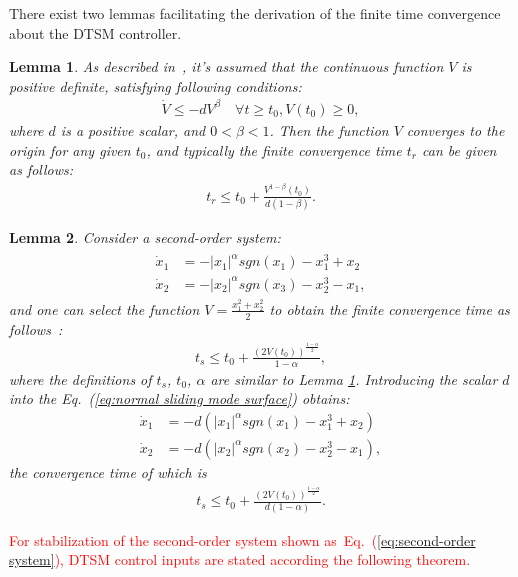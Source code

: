 \documentclass[3p]{elsarticle}
\theoremstyle{plain}
\newtheorem{mylem}{Lemma}
\theoremstyle{remark}
\begin{document}
There exist two lemmas facilitating the derivation of the finite time convergence about the DTSM controller.
\begin{mylem}
As described in~\cite{moulay2006finite}, it's assumed that the continuous function $V$ is positive definite, satisfying following conditions:
\begin{align}
\dot V\le -dV^\beta\quad\forall t\ge t_0, V(t_0)\ge 0,
\end{align}
where $d$ is a positive scalar, and $0<\beta<1$. Then the function $V$ converges to the origin for any given $t_0$, and typically the finite convergence time $t_r$ can be given as follows:
\begin{align}
t_r \le t_0+\frac{V^{1-\beta}(t_0)}{d(1-\beta)}.
\end{align}\label{lemma:1}
\end{mylem}
\begin{mylem}
Consider a second-order system:
\begin{align}
\begin{split}
\dot x_1&=-\vert x_1\vert^\alpha sgn(x_1)-x_1^3+x_2\\
\dot x_2&=-\vert x_2\vert^\alpha sgn(x_3)-x_2^3-x_1,\label{eq:normal sliding mode  surface}
\end{split}
\end{align}
and one can select the function $V = \frac{x_1^2+x_2^2}{2}$ to obtain the finite convergence time as follows~\cite{moulay2006finite}:
\begin{align}
t_s\le t_0+\frac{(2V(t_0))^{\frac{1-\alpha}{2}}}{1-\alpha},
\end{align}
where the definitions of  $t_s$, $t_0$, $\alpha$ are similar to Lemma \ref{lemma:1}. Introducing the scalar $d$ into the Eq.~(\ref{eq:normal sliding mode  surface}) obtains:
\begin{align}
\dot x_1&=-d(\vert x_1\vert^\alpha sgn(x_1)-x_1^3+x_2)\\
\dot x_2&=-d(\vert x_2\vert^\alpha sgn(x_2)-x_2^3-x_1),\label{eq:more normal sliding mode  surface}
\end{align}
the convergence time of which is
\begin{align}
t_s\le t_0+\frac{(2V(t_0))^{\frac{1-\alpha}{2}}}{d(1-\alpha)}.
\end{align}\label{lemma:2}
\end{mylem}
\textcolor{red}{For stabilization of the second-order system shown as~Eq.~(\ref{eq:second-order system}), DTSM control inputs are stated according the following theorem.}
\end{document}

